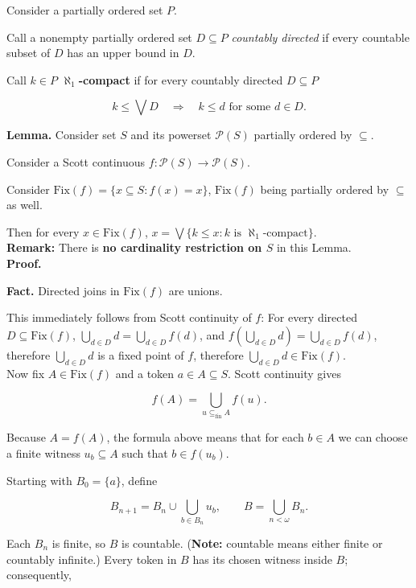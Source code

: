 \documentclass{article}
\begin{document}
Consider a partially ordered set $P$.

Call a nonempty partially ordered set $D \subseteq P$ {\em countably directed} if every countable subset of $D$ has an upper bound in $D$. 

Call $k \in P$ {\bf $\aleph_1$-compact} if for every countably directed $D \subseteq P$

$$
k\leq\bigvee D\quad\Longrightarrow\quad
k\leq d\mbox{ for some }d\in D .
$$ 


{\bf Lemma.} Consider set $S$ and its powerset $\mathcal P(S)$ partially ordered by $\subseteq$.

Consider a Scott continuous $f:\mathcal P(S)\to\mathcal P(S)$. 

Consider $\mathrm{Fix}(f) = \{x \subseteq S: f(x) = x\}$,
$\mathrm{Fix}(f)$ being partially ordered by $\subseteq$ as well.

Then for every $x\in \mathrm{Fix}(f)$, $x=\bigvee\{k\leq x:k\mbox{ is }\aleph_1\mbox{-compact}\}$.\\

{\bf Remark:} There is {\bf no cardinality restriction on $S$} in this Lemma.\\

{\bf Proof.}

{\bf Fact.} Directed joins in $\mathrm{Fix}(f)$ are unions.

This immediately follows from Scott continuity of $f$:
For every directed $D \subseteq \mathrm{Fix}(f)$, $\bigcup_{d\in D}d = \bigcup_{d\in D} f(d)$, and $f(\bigcup_{d\in D} d) =  \bigcup_{d\in D}f(d)$,
therefore $\bigcup_{d\in D}d$ is a fixed point of $f$, therefore $\bigcup_{d\in D}d \in \mathrm{Fix}(f)$.\\

Now fix $A\in \mathrm{Fix}(f)$ and a token $a\in A \subseteq S$. Scott continuity gives

$$
f(A)=\bigcup_{u\subseteq_{\mathrm{fin}}A}f(u).
$$

Because $A=f(A)$, the formula above means that for each $b\in A$ we can choose a finite witness $u_b\subseteq A$ such that $b\in f(u_b)$.

Starting with $B_0=\{a\}$, define

$$
B_{n+1}=B_n\cup\bigcup_{b\in B_n}u_b,
\qquad
B=\bigcup_{n<\omega}B_n.
$$

Each $B_n$ is finite, so $B$ is countable. ({\bf Note:} countable means either finite or countably infinite.) Every token in $B$ has its chosen witness inside $B$; consequently,
\end{document}
